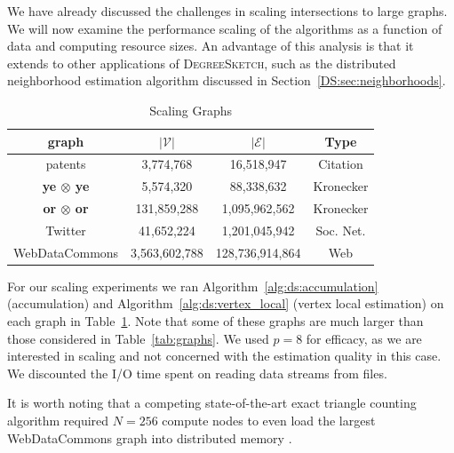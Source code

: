 \documentclass[10]{article}
\newcommand{\algoname}[1]{\textnormal{\textsc{#1}}}
\begin{document}
We have already discussed the challenges in scaling intersections to large graphs. 
We will now examine the performance scaling of the algorithms as a function of data and computing resource sizes.
An advantage of this analysis is that it extends to other applications of \algoname{DegreeSketch}, such as the distributed neighborhood estimation algorithm discussed in Section~\ref{DS:sec:neighborhoods}.

\begin{table}[htbp]
\caption{Scaling Graphs \label{tab:scaling_graphs}}
\begin{center}
\begin{tabular}{|c|c|c|c|}
\hline
\textbf{graph} & $|\mathcal{V}|$ &  $|\mathcal{E}|$ & Type \\
\hline
\hline
patents & 3,774,768 & 16,518,947 & Citation \\
\hline
\textbf{ye $\boldsymbol{\otimes}$ ye} & 5,574,320 & 88,338,632 & Kronecker \\
\hline
\textbf{or $\boldsymbol{\otimes}$ or} & 131,859,288 & 1,095,962,562 & Kronecker \\
\hline
Twitter & 41,652,224 & 1,201,045,942 & Soc. Net. \cite{kunegis2013konect} \\
\hline
WebDataCommons & 3,563,602,788 & 128,736,914,864 & Web \\
\hline
\end{tabular}
\end{center}
\end{table}


For our scaling experiments we ran Algorithm~\ref{alg:ds:accumulation} (accumulation) and Algorithm~\ref{alg:ds:vertex_local} (vertex local estimation) on each graph in Table~\ref{tab:scaling_graphs}.
Note that some of these graphs are much larger than those considered in Table~\ref{tab:graphs}.
We used $p=8$ for efficacy, as we are interested in scaling and not concerned with the estimation quality in this case. 
We discounted the I/O time spent on reading data streams from files.

It is worth noting that a competing state-of-the-art exact triangle counting algorithm required $N=256$ compute nodes to even load the largest WebDataCommons graph into distributed memory \cite{pearce2017triangle}.
\end{document}
